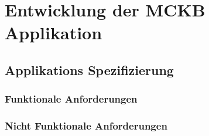 %
%
% 
% 


\chapter{Entwicklung der MCKB Applikation}
\label{chap:xamarinformsdevelopment}

\section{Applikations Spezifizierung}
\label{sec:mckspecs}

\subsection{Funktionale Anforderungen}
\label{sec:mckbfunkcspecs}

\subsection{Nicht Funktionale Anforderungen}
\label{sec:mckbnonfuncspecs}
